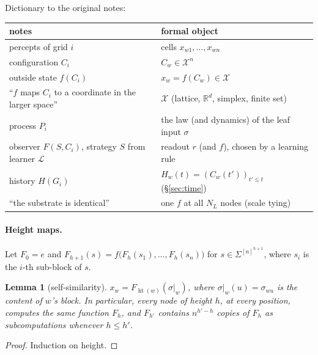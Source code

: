 \documentclass[11pt]{article}
\newtheorem{lemma}[theorem]{Lemma}
\theoremstyle{definition}
\newcommand{\R}{\mathbb{R}}
\newcommand{\hgt}{\operatorname{ht}}
\newcommand{\Nint}{N_{L}}
\newcommand{\cX}{\mathcal{X}}
\begin{document}
\noindent Dictionary to the original notes:
\begin{center}\begin{tabular}{ll}
\toprule
notes & formal object\\\midrule
percepts of grid $i$ & cells $x_{w1},\dots,x_{wn}$\\
configuration $C_i$ & $C_w\in\cX^n$\\
outside state $f(C_i)$ & $x_w=f(C_w)\in\cX$\\
``$f$ maps $C_i$ to a coordinate in the larger space'' & $\cX$ (lattice, $\R^d$, simplex, finite set)\\
process $P_i$ & the law (and dynamics) of the leaf input $\sigma$\\
observer $F(S,C_i)$, strategy $S$ from learner $\mathcal L$ & readout $r$ (and $f$), chosen by a learning rule\\
history $H(G_i)$ & $H_w(t)=(C_w(t'))_{t'\le t}$ (\S\ref{sec:time})\\
``the substrate is identical'' & one $f$ at all $\Nint$ nodes (scale tying)\\
\bottomrule
\end{tabular}\end{center}

\paragraph{Height maps.} Let $F_0=e$ and
$F_{h+1}(s)=f\big(F_h(s_1),\dots,F_h(s_n)\big)$ for $s\in\Sigma^{[n]^{h+1}}$, where $s_i$ is the
$i$-th sub-block of $s$.
\begin{lemma}[self-similarity]\label{lem:selfsim}
$x_w=F_{\hgt(w)}(\sigma|_w)$, where $\sigma|_w(u)=\sigma_{wu}$ is the content of $w$'s block.
In particular, every node of height $h$, at every position, computes the same function $F_h$,
and $F_{h'}$ contains $n^{h'-h}$ copies of $F_h$ as subcomputations whenever $h\le h'$.
\end{lemma}
\begin{proof}Induction on height.\end{proof}
\end{document}

